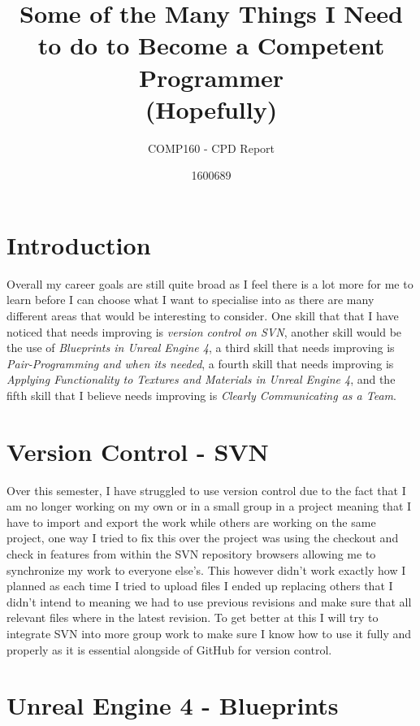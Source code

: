 \documentclass{scrartcl}
\title{Some of the Many Things I Need to do to Become a Competent Programmer \\ (Hopefully)}
\subtitle{COMP160 - CPD Report}
\author{1600689}
\begin{document}
\maketitle

\section{Introduction}

Overall my career goals are still quite broad as I feel there is a lot more for me to learn before I can choose what I want to specialise into as there are many different areas that would be interesting to consider. One skill that that I have noticed that needs improving is \textit{version control on SVN}, another skill would be the use of \textit{Blueprints in Unreal Engine 4}, a third skill that needs improving is \textit{Pair-Programming and when its needed}, a fourth skill that needs improving is \textit{Applying Functionality to Textures and Materials in Unreal Engine 4}, and the fifth skill that I believe needs improving is \textit{Clearly Communicating as a Team}.

\section{Version Control - SVN}

Over this semester, I have struggled to use version control due to the fact that I am no longer working on my own or in a small group in a project meaning that I have to import and export the work while others are working on the same project, one way I tried to fix this over the project was using the checkout and check in features from within the SVN repository browsers allowing me to synchronize my work to everyone else’s. This however didn’t work exactly how I planned as each time I tried to upload files I ended up replacing others that I didn’t intend to meaning we had to use previous revisions and make sure that all relevant files where in the latest revision. To get better at this I will try to integrate SVN into more group work to make sure I know how to use it fully and properly as it is essential alongside of GitHub for version control. 

\section{Unreal Engine 4 - Blueprints}
\end{document}
